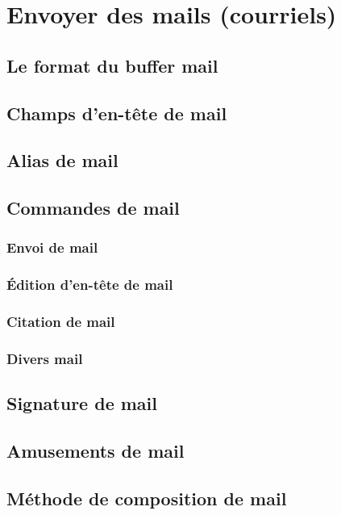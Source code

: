 \chapter{Envoyer des mails (courriels)}\label{chap29}
\section{Le format du buffer mail}\label{chap29sec1}
\section{Champs d'en-tête de mail}\label{chap29sec2}
\section{Alias de mail}\label{chap29sec3}
\section{Commandes de mail}\label{chap29sec4}
\subsection{Envoi de mail}\label{chap29sec4subsec1}
\subsection{\'Edition d'en-tête de mail}\label{chap29sec4subsec2}
\subsection{Citation de mail}\label{chap29sec4subsec3}
\subsection{Divers mail}\label{chap29sec4subsec4}
\section{Signature de mail}\label{chap29sec5}
\section{Amusements de mail}\label{chap29sec6}
\section{Méthode de composition de mail}\label{chap29sec7}
